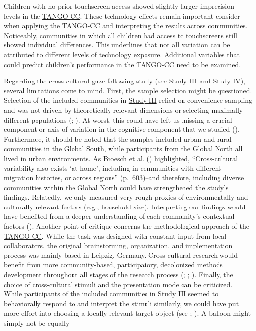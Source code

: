 \documentclass[
]{scrbook}
\begin{document}
Children with no prior touchscreen access showed slightly larger imprecision levels in the \hyperref[acronyms_TANGO-CC]{TANGO-CC}. These technology effects remain important consider when applying the \hyperref[acronyms_TANGO-CC]{TANGO-CC} and interpreting the results across communities. Noticeably, communities in which all children had access to touchscreens still showed individual differences. This underlines that not all variation can be attributed to different levels of technology exposure. Additional variables that could predict children's performance in the \hyperref[acronyms_TANGO-CC]{TANGO-CC} need to be examined.

Regarding the cross-cultural gaze-following study (see \hyperref[studyIII]{Study III} and \hyperref[studyIV]{Study IV}), several limitations come to mind. First, the sample selection might be questioned. Selection of the included communities in \hyperref[studyIII]{Study III} relied on convenience sampling and was not driven by theoretically relevant dimensions or selecting maximally different populations (; ). At worst, this could have left us missing a crucial component or axis of variation in the cognitive component that we studied (). Furthermore, it should be noted that the samples included urban and rural communities in the Global South, while participants from the Global North all lived in urban environments. As Broesch et al. () highlighted, ``Cross-cultural variability also exists `at home', including in communities with different migration histories, or across regions'' (p.~603)\thinspace --\thinspace and therefore, including diverse communities within the Global North could have strengthened the study's findings. Relatedly, we only measured very rough proxies of environmentally and culturally relevant factors (e.g., household size). Interpreting our findings would have benefited from a deeper understanding of each community's contextual factors (). Another point of critique concerns the methodological approach of the \hyperref[acronyms_TANGO-CC]{TANGO-CC}. While the task was designed with constant input from local collaborators, the original brainstorming, organization, and implementation process was mainly based in Leipzig, Germany. Cross-cultural research would benefit from more community-based, participatory, decolonized methods development throughout all stages of the research process (; ; ). Finally, the choice of cross-cultural stimuli and the presentation mode can be criticized. While participants of the included communities in \hyperref[studyIII]{Study III} seemed to behaviorally respond to and interpret the stimuli similarly, we could have put more effort into choosing a locally relevant target object (see ; ). A balloon might simply not be equally 
\end{document}
